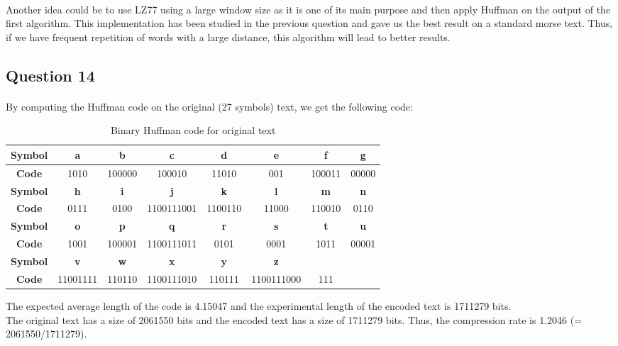 \documentclass[a4paper, 11pt, oneside]{article}
\begin{document}
\paragraph{}Another idea could be to use LZ77 using a large window size as it is one of its main purpose and then apply Huffman on the output of the first algorithm.
This implementation has been studied in the previous question and gave us the best result on a standard morse text. Thus, if we have frequent repetition of words with 
a large distance, this algorithm will lead to better results.

\subsection{Question 14}
\paragraph{}By computing the Huffman code on the original (27 symbols) text, we get the following code:
\begin{table}[H]
    \centering
    \begin{tabular}{|c|c|c|c|c|c|c|c|}
    \hline
    \textbf{Symbol} & \textbf{a} & \textbf{b} & \textbf{c} & \textbf{d} & \textbf{e} & \textbf{f} & \textbf{g} \\ \hline
    \textbf{Code}   & 1010       & 100000     & 100010     & 11010      & 001        & 100011     & 00000      \\ \hline
    \textbf{Symbol} & \textbf{h} & \textbf{i} & \textbf{j} & \textbf{k} & \textbf{l} & \textbf{m} & \textbf{n} \\ \hline
    \textbf{Code}   & 0111       & 0100       & 1100111001 & 1100110    & 11000      & 110010     & 0110       \\ \hline
    \textbf{Symbol} & \textbf{o} & \textbf{p} & \textbf{q} & \textbf{r} & \textbf{s} & \textbf{t} & \textbf{u} \\ \hline
    \textbf{Code}   & 1001       & 100001     & 1100111011 & 0101       & 0001       & 1011       & 00001      \\ \hline
    \textbf{Symbol} & \textbf{v} & \textbf{w} & \textbf{x} & \textbf{y} & \textbf{z} & \textbf{}  & \textbf{}  \\ \hline
    \textbf{Code}   & 11001111   & 110110     & 1100111010 & 110111     & 1100111000 & 111        &            \\ \hline
    \end{tabular}
    \caption{Binary Huffman code for original text}
\end{table}
The expected average length of the code is 4.15047 and the experimental length of the encoded text is 1711279 bits.\\
The original text has a size of 2061550 bits and the encoded text has a size of 1711279 bits. Thus, the compression rate is 1.2046 (= 2061550/1711279).
\end{document}
